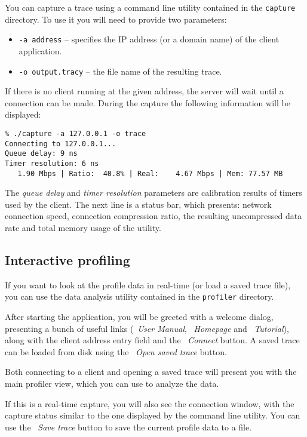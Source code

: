 \documentclass[hidelinks,titlepage,a4paper]{article}
\begin{document}
You can capture a trace using a command line utility contained in the \texttt{capture} directory. To use it you will need to provide two parameters:

\begin{itemize}
\item \texttt{-a address} -- specifies the IP address (or a domain name) of the client application.
\item \texttt{-o output.tracy} -- the file name of the resulting trace.
\end{itemize}

If there is no client running at the given address, the server will wait until a connection can be made. During the capture the following information will be displayed:

\begin{verbatim}
% ./capture -a 127.0.0.1 -o trace
Connecting to 127.0.0.1...
Queue delay: 9 ns
Timer resolution: 6 ns
   1.90 Mbps | Ratio:  40.8% | Real:    4.67 Mbps | Mem: 77.57 MB
\end{verbatim}

The \emph{queue delay} and \emph{timer resolution} parameters are calibration results of timers used by the client. The next line is a status bar, which presents: network connection speed, connection compression ratio, the resulting uncompressed data rate and total memory usage of the utility.

\subsection{Interactive profiling}

If you want to look at the profile data in real-time (or load a saved trace file), you can use the data analysis utility contained in the \texttt{profiler} directory.

After starting the application, you will be greeted with a welcome dialog, presenting a bunch of useful links (\faBook{}~\emph{User Manual}, \faGlobe{}~\emph{Homepage} and \faVideoCamera{}~\emph{Tutorial}), along with the client address entry field and the \faWifi{}~\emph{Connect} button. A saved trace can be loaded from disk using the \faFolderOpen{}~\emph{Open saved trace} button.

Both connecting to a client and opening a saved trace will present you with the main profiler view, which you can use to analyze the data.

If this is a real-time capture, you will also see the connection window, with the capture status similar to the one displayed by the command line utility. You can use the \faSave{}~\emph{Save trace} button to save the current profile data to a file.
\end{document}
